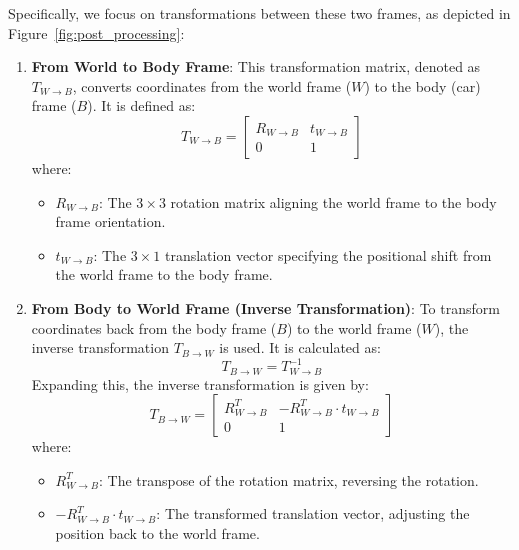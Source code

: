 Specifically, we focus on transformations between these two frames, as depicted in Figure~\ref{fig:post_processing}:
\begin{enumerate}
    \item \textbf{From World to Body Frame}: This transformation matrix, denoted as \( T_{W \to B} \), converts coordinates from the world frame (\( W \)) to the body (car) frame (\( B \)). It is defined as:
    \begin{equation}
        T_{W \to B} = \begin{bmatrix} 
        R_{W \to B} & t_{W \to B} \\ 
        0 & 1 
        \end{bmatrix}
    \end{equation}
    where:
    \begin{itemize}
        \item \( R_{W \to B} \): The \( 3 \times 3 \) rotation matrix aligning the world frame to the body frame orientation.
        \item \( t_{W \to B} \): The \( 3 \times 1 \) translation vector specifying the positional shift from the world frame to the body frame.
    \end{itemize}
    
    \item \textbf{From Body to World Frame (Inverse Transformation)}: To transform coordinates back from the body frame (\( B \)) to the world frame (\( W \)), the inverse transformation \( T_{B \to W} \) is used. It is calculated as:
    \begin{equation}
        T_{B \to W} = T_{W \to B}^{-1}
    \end{equation}
    Expanding this, the inverse transformation is given by:
    \begin{equation}
        T_{B \to W} = \begin{bmatrix} 
        R_{W \to B}^T & -R_{W \to B}^T \cdot t_{W \to B} \\ 
        0 & 1 
        \end{bmatrix}
    \end{equation}
    where:
    \begin{itemize}
        \item \( R_{W \to B}^T \): The transpose of the rotation matrix, reversing the rotation.
        \item \( -R_{W \to B}^T \cdot t_{W \to B} \): The transformed translation vector, adjusting the position back to the world frame.
    \end{itemize}
\end{enumerate}
